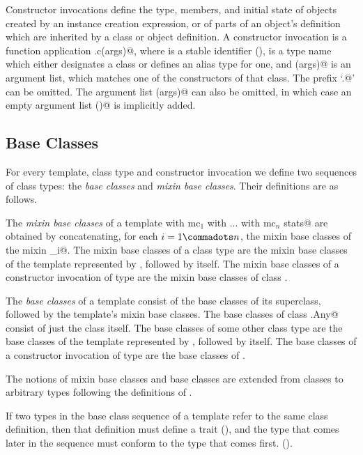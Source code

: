 \documentclass[11pt]{report}
\begin{document}
Constructor invocations define the type, members, and initial state of
objects created by an instance creation expression, or of parts of an
object's definition which are inherited by a class or object
definition. A constructor invocation is a function application
\verb@x.c(args)@, where \verb@x@ is a stable identifier
(), \verb@c@ is a type name which either
designates a class or defines an alias type for one, and \verb@(args)@
is an argument list, which matches one of the constructors of that
class. The prefix `\verb@x.@' can be omitted. 
The argument list \verb@(args)@ can also be omitted, in which case an
empty argument list \verb@()@ is implicitly added.

\subsection{Base Classes}
\label{sec:base-classes}

For every template, class type and constructor invocation we define two
sequences of class types: the {\em base classes} and {\em mixin base
classes}. Their definitions are as follows.

The {\em mixin base classes} of a template
\verb@sc with mc$_1$ with ... with mc$_n$ {stats}@ are obtained by
concatenating, for each $i = 1 \commadots n$, the mixin base classes
of the mixin \verb@mc_i@. The mixin base classes of a class type \verb@C@ are
the mixin base classes of the template represented by \verb@C@, followed by
\verb@C@ itself. The mixin base classes of a constructor invocation of type
\verb@T@ are the mixin base classes of class \verb@T@.

The {\em base classes} of a template consist of the base classes of
its superclass, followed by the template's mixin base classes.  The
base classes of class \verb@scala.Any@ consist of just the
class itself. The base classes of some other class type \verb@C@ are the
base classes of the template represented by \verb@C@, followed by \verb@C@
itself.  The base classes of a constructor invocation of type \verb@T@
are the base classes of \verb@T@.

The notions of mixin base classes and base classes are extended from
classes to arbitrary types following the definitions of
.
 
If two types in the base class sequence of a template refer to the
same class definition, then that definition must define a trait
(), and the type that comes later in the sequence must
conform to the type that comes first. 
().
\end{document}

